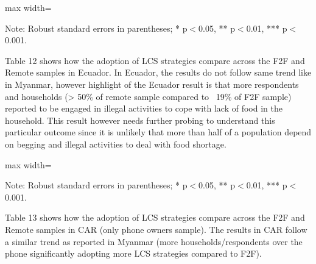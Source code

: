 \documentclass[11pt,harvard]{article}
\begin{document}
\begin{table}[htbp]
	\centering
	\begin{adjustbox}{max width=\textwidth}
		\begin{threeparttable}
			\caption{Myanmar: Each Coping Strategy Used}
			\scriptsize
			 
			\label{tab:LCS_Ind_Modality_Myanmar}
			\begin{tablenotes}
				\item Note: Robust standard errors in parentheses; * p$<$0.05, ** p$<$0.01, *** p$<$0.001. 
			\end{tablenotes}
		\end{threeparttable}
	\end{adjustbox}
\end{table}

Table 12 shows how the adoption of LCS strategies compare across the F2F and Remote samples in Ecuador. In Ecuador, the results do not follow same trend like in Myanmar, however highlight of the Ecuador result is that more respondents and households (> 50\% of remote sample compared to ~19\% of F2F sample) reported to be engaged in illegal activities to cope with lack of food in the household. This result however needs further probing to understand this particular outcome since it is unlikely that more than half of a population depend on begging and illegal activities to deal with food shortage. 


\begin{table}[htbp]
	\centering
	\begin{adjustbox}{max width=\textwidth}
		\begin{threeparttable}
			\caption{Ecaudor: Each Coping Strategy Used}
			\scriptsize
			 
			\label{tab:LCS_Ind_Modality_Ecuador}
			\begin{tablenotes}
				\item Note: Robust standard errors in parentheses; * p$<$0.05, ** p$<$0.01, *** p$<$0.001. 
			\end{tablenotes}
		\end{threeparttable}
	\end{adjustbox}
\end{table}

Table 13 shows how the adoption of LCS strategies compare across the F2F and Remote samples in CAR (only phone owners sample). The results in CAR follow a similar trend as reported in Myanmar (more households/respondents over the phone significantly adopting more LCS strategies compared to F2F). 
\end{document}
